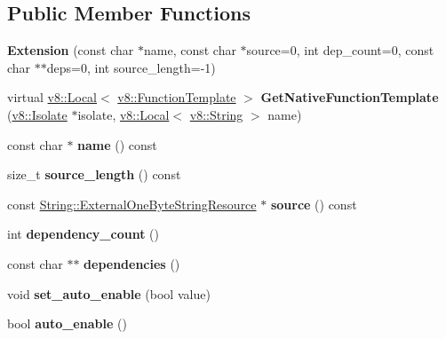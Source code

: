 \subsection*{Public Member Functions}
\begin{DoxyCompactItemize}
\item 
{\bfseries Extension} (const char $\ast$name, const char $\ast$source=0, int dep\+\_\+count=0, const char $\ast$$\ast$deps=0, int source\+\_\+length=-\/1)\hypertarget{classv8_1_1_extension_a10868673b7801cc1139ca3bc09bcfcf6}{}\label{classv8_1_1_extension_a10868673b7801cc1139ca3bc09bcfcf6}

\item 
virtual \hyperlink{classv8_1_1_local}{v8\+::\+Local}$<$ \hyperlink{classv8_1_1_function_template}{v8\+::\+Function\+Template} $>$ {\bfseries Get\+Native\+Function\+Template} (\hyperlink{classv8_1_1_isolate}{v8\+::\+Isolate} $\ast$isolate, \hyperlink{classv8_1_1_local}{v8\+::\+Local}$<$ \hyperlink{classv8_1_1_string}{v8\+::\+String} $>$ name)\hypertarget{classv8_1_1_extension_a39b4273aa4c7258b65bad3e1e469e59e}{}\label{classv8_1_1_extension_a39b4273aa4c7258b65bad3e1e469e59e}

\item 
const char $\ast$ {\bfseries name} () const \hypertarget{classv8_1_1_extension_a183946edbf28789f7cddecdad2d26f96}{}\label{classv8_1_1_extension_a183946edbf28789f7cddecdad2d26f96}

\item 
size\+\_\+t {\bfseries source\+\_\+length} () const \hypertarget{classv8_1_1_extension_a91da6067f79c5c354aa3184ed0746966}{}\label{classv8_1_1_extension_a91da6067f79c5c354aa3184ed0746966}

\item 
const \hyperlink{classv8_1_1_string_1_1_external_one_byte_string_resource}{String\+::\+External\+One\+Byte\+String\+Resource} $\ast$ {\bfseries source} () const \hypertarget{classv8_1_1_extension_a5c68ba79f0cf009a1c3e972d7b3b1f50}{}\label{classv8_1_1_extension_a5c68ba79f0cf009a1c3e972d7b3b1f50}

\item 
int {\bfseries dependency\+\_\+count} ()\hypertarget{classv8_1_1_extension_a7623b08e3bc42d903bd923a00317b7f9}{}\label{classv8_1_1_extension_a7623b08e3bc42d903bd923a00317b7f9}

\item 
const char $\ast$$\ast$ {\bfseries dependencies} ()\hypertarget{classv8_1_1_extension_adbec8a811d5a4554678da4a5d55dda6d}{}\label{classv8_1_1_extension_adbec8a811d5a4554678da4a5d55dda6d}

\item 
void {\bfseries set\+\_\+auto\+\_\+enable} (bool value)\hypertarget{classv8_1_1_extension_af5b752ba211315b6e9dac5c0e6e638e8}{}\label{classv8_1_1_extension_af5b752ba211315b6e9dac5c0e6e638e8}

\item 
bool {\bfseries auto\+\_\+enable} ()\hypertarget{classv8_1_1_extension_aee87ef4f9c3d7880fc3b28765d28e516}{}\label{classv8_1_1_extension_aee87ef4f9c3d7880fc3b28765d28e516}

\end{DoxyCompactItemize}
